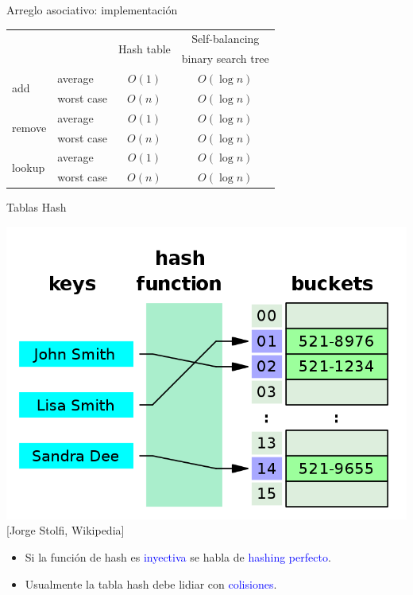 \documentclass[handout]{beamer} %
\newcommand{\blue}[1]{\textcolor{blue}{#1}}
\begin{document}
\begin{frame}{Arreglo asociativo: implementación}
    \begin{center}
    \begin{tabular}{l|l|c|c}
        \multicolumn{2}{l|}{} & \multirow{2}{*}{Hash table} & Self-balancing\\
        \multicolumn{2}{l|}{} & & binary search tree \\\hline
        \multirow{2}{*}{add}  & average & $O(1)$ & $O(\log n)$\\\cline{2-4}
        & worst case & $O(n)$ & $O(\log n)$\\\hline
        \multirow{2}{*}{remove} & average & $O(1)$ & $O(\log n)$\\\cline{2-4}
        & worst case & $O(n)$ & $O(\log n)$\\\hline
        \multirow{2}{*}{lookup} & average & $O(1)$ & $O(\log n)$\\\cline{2-4}
        & worst case & $O(n)$ & $O(\log n)$\\
    \end{tabular}
    \end{center}
\end{frame}

\begin{frame}{Tablas Hash}
    \begin{center}
        \includegraphics[width=.7\textwidth]{./image/cap4/hash-table.png}\\
        {\tiny [Jorge Stolfi, Wikipedia]}
    \end{center}
    \vspace{-2ex}

    \begin{itemize}
      \item<2-> Si la función de hash es \blue{inyectiva} se habla de \blue{hashing perfecto}.
      \item<3-> Usualmente la tabla hash debe lidiar con \blue{colisiones}.
    \end{itemize}
\end{frame}
\end{document}
